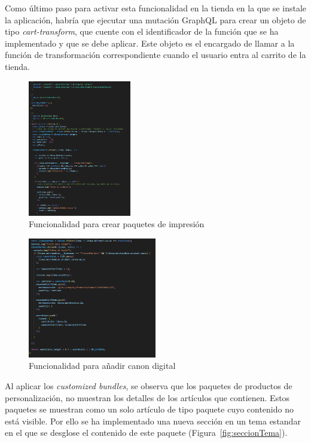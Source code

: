 \documentclass[12pt]{article}
\begin{document}
Como último paso para activar esta funcionalidad en la tienda en la que se instale la aplicación, habría que ejecutar una mutación GraphQL para crear un objeto de tipo \textit{cart-transform}, que cuente con el identificador de la función que se ha implementado
y que se debe aplicar. Este objeto es el encargado de llamar a la función de transformación correspondiente cuando el usuario entra al carrito de la tienda.

\begin{figure}[ht]
    \centering
    \includegraphics[width=0.4\textwidth]{imagenes-tema/primeraParteFunction.png}
    \caption{\label{fig:runpart1} Funcionalidad para crear paquetes de impresión} 
    \vspace{\fill}
\end{figure}

\begin{figure}[ht]
    \centering
    \includegraphics[width=0.5\textwidth]{imagenes-tema/segundaParteFunction.png}
    \caption{\label{fig:runpart2} Funcionalidad para añadir canon digital} 
    \vspace{\fill}
\end{figure}

Al aplicar los \textit{customized bundles}, se observa que los paquetes de productos de personalización, no muestran los detalles de los artículos que contienen. Estos 
paquetes se muestran como un solo artículo de tipo paquete cuyo contenido no está visible. Por ello se ha implementado una nueva sección en un tema estandar en el que 
se desglose el contenido de este paquete (Figura~\ref{fig:seccionTema}).
\end{document}
